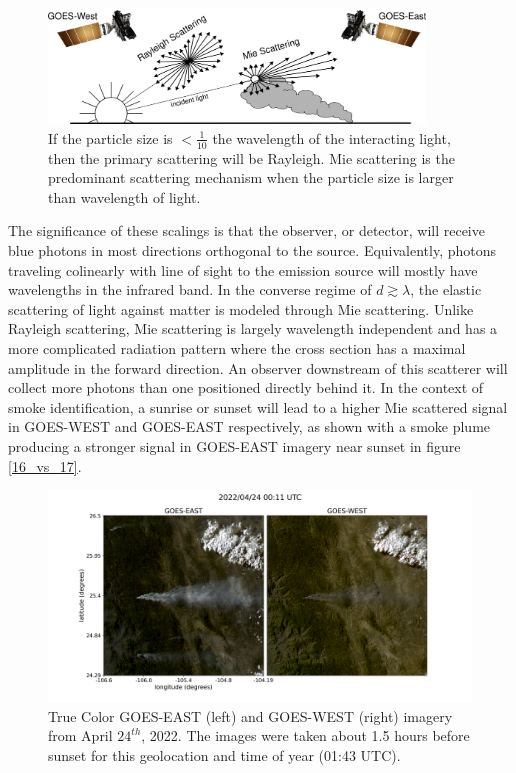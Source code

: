 \documentclass{ametsocV6.1}
\begin{document}
\begin{figure}
    \centering
    \includegraphics[width=10cm]{figures/mei.png}
    \caption{If the particle size is $<\frac{1}{10}$ the wavelength of the interacting light, then the primary scattering will be Rayleigh. Mie scattering is the predominant scattering mechanism when the particle size is larger than wavelength of light.} \label{mei}
\end{figure}

The significance of these scalings is that the observer, or detector, will receive blue photons in most directions orthogonal to the source. Equivalently, photons traveling colinearly with line of sight to the emission source will mostly have wavelengths in the infrared band. In the converse regime of $d \gtrsim \lambda$, the elastic scattering of light against matter is modeled through Mie scattering. Unlike Rayleigh scattering, Mie scattering is largely wavelength independent and has a more complicated radiation pattern where the cross section has a maximal amplitude in the forward direction. An observer downstream of this scatterer will collect more photons than one positioned directly behind it. In the context of smoke identification, a sunrise or sunset will lead to a higher Mie scattered signal in GOES-WEST and GOES-EAST respectively, as shown with a smoke plume producing a stronger signal in GOES-EAST imagery near sunset in figure \ref{16_vs_17}.

\begin{figure}\label{16_vs_17}
    \centering
    \includegraphics[width=15cm]{figures/G16_v_G17.png}
    \caption{True Color GOES-EAST (left) and GOES-WEST (right) imagery from April $24^{th}$, 2022. The images were taken about 1.5 hours before sunset for this geolocation and time of year (01:43 UTC).}\label{16vs17}
\end{figure}
\end{document}
